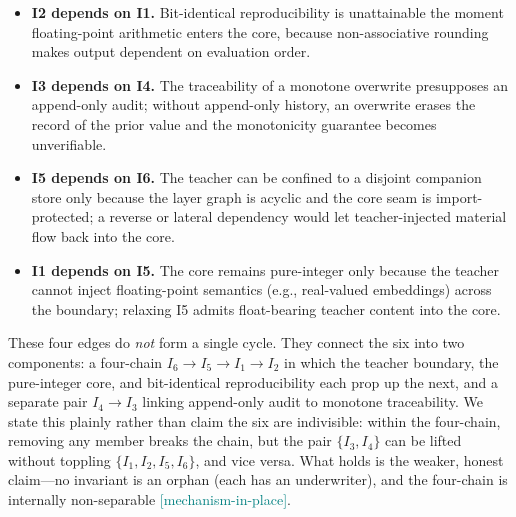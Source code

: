 \documentclass[11pt,a4paper]{article}
\newcommand{\statusmech}{\textcolor{teal}{\small\textsf{[mechanism-in-place]}}}
\begin{document}
\begin{itemize}[leftmargin=*]
\item \textbf{I2 depends on I1.} Bit-identical reproducibility is
unattainable the moment floating-point arithmetic enters the core, because
non-associative rounding makes output dependent on evaluation order.
\item \textbf{I3 depends on I4.} The traceability of a monotone overwrite
presupposes an append-only audit; without append-only history, an
overwrite erases the record of the prior value and the monotonicity
guarantee becomes unverifiable.
\item \textbf{I5 depends on I6.} The teacher can be confined to a disjoint
companion store only because the layer graph is acyclic and the core seam
is import-protected; a reverse or lateral dependency would let
teacher-injected material flow back into the core.
\item \textbf{I1 depends on I5.} The core remains pure-integer only because
the teacher cannot inject floating-point semantics (e.g., real-valued
embeddings) across the boundary; relaxing I5 admits float-bearing teacher
content into the core.
\end{itemize}

\noindent These four edges do \emph{not} form a single cycle. They
connect the six into two components: a four-chain
$I_6 \to I_5 \to I_1 \to I_2$ in which the teacher boundary, the
pure-integer core, and bit-identical reproducibility each prop up the
next, and a separate pair $I_4 \to I_3$ linking append-only audit to
monotone traceability. We state this plainly rather than claim the six
are indivisible: within the four-chain, removing any member breaks the
chain, but the pair $\{I_3, I_4\}$ can be lifted without toppling
$\{I_1, I_2, I_5, I_6\}$, and vice versa. What holds is the weaker,
honest claim---no invariant is an orphan (each has an underwriter), and
the four-chain is internally non-separable \statusmech.
\end{document}

